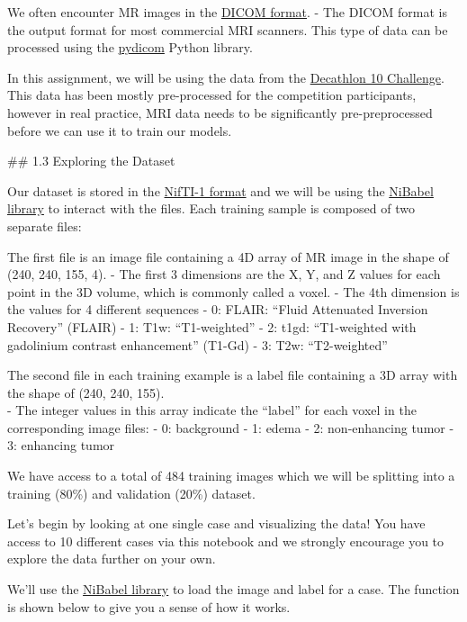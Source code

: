 \documentclass[11pt]{article}
\begin{document}
We often encounter MR images in the
\href{https://en.wikipedia.org/wiki/DICOM}{DICOM format}. - The DICOM
format is the output format for most commercial MRI scanners. This type
of data can be processed using the
\href{https://pydicom.github.io/pydicom/stable/getting_started.html}{pydicom}
Python library.

In this assignment, we will be using the data from the
\href{https://decathlon-10.grand-challenge.org}{Decathlon 10 Challenge}.
This data has been mostly pre-processed for the competition
participants, however in real practice, MRI data needs to be
significantly pre-preprocessed before we can use it to train our models.

     \#\# 1.3 Exploring the Dataset

Our dataset is stored in the
\href{https://nifti.nimh.nih.gov/nifti-1/}{NifTI-1 format} and we will
be using the \href{https://github.com/nipy/nibabel}{NiBabel library} to
interact with the files. Each training sample is composed of two
separate files:

The first file is an image file containing a 4D array of MR image in the
shape of (240, 240, 155, 4). - The first 3 dimensions are the X, Y, and
Z values for each point in the 3D volume, which is commonly called a
voxel. - The 4th dimension is the values for 4 different sequences - 0:
FLAIR: ``Fluid Attenuated Inversion Recovery'' (FLAIR) - 1: T1w:
``T1-weighted'' - 2: t1gd: ``T1-weighted with gadolinium contrast
enhancement'' (T1-Gd) - 3: T2w: ``T2-weighted''

The second file in each training example is a label file containing a 3D
array with the shape of (240, 240, 155).\\
- The integer values in this array indicate the ``label'' for each voxel
in the corresponding image files: - 0: background - 1: edema - 2:
non-enhancing tumor - 3: enhancing tumor

We have access to a total of 484 training images which we will be
splitting into a training (80\%) and validation (20\%) dataset.

Let's begin by looking at one single case and visualizing the data! You
have access to 10 different cases via this notebook and we strongly
encourage you to explore the data further on your own.

    We'll use the
\href{https://nipy.org/nibabel/nibabel_images.html}{NiBabel library} to
load the image and label for a case. The function is shown below to give
you a sense of how it works.
\end{document}
